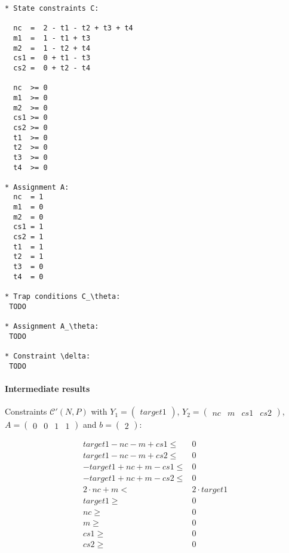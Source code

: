 \documentclass{article}
\begin{document}
\begin{verbatim}
* State constraints C:

  nc  =  2 - t1 - t2 + t3 + t4
  m1  =  1 - t1 + t3
  m2  =  1 - t2 + t4
  cs1 =  0 + t1 - t3
  cs2 =  0 + t2 - t4

  nc  >= 0
  m1  >= 0
  m2  >= 0
  cs1 >= 0
  cs2 >= 0
  t1  >= 0
  t2  >= 0
  t3  >= 0
  t4  >= 0

* Assignment A:
  nc  = 1
  m1  = 0
  m2  = 0
  cs1 = 1
  cs2 = 1
  t1  = 1
  t2  = 1
  t3  = 0
  t4  = 0

* Trap conditions C_\theta:
 TODO

* Assignment A_\theta:
 TODO

* Constraint \delta:
 TODO
\end{verbatim}








































\iffalse

\paragraph{Intermediate results}
Constraints $\mathcal C'(N, P)$ with
$Y_1 = \begin{pmatrix}target1 \end{pmatrix}$,
$Y_2 =\begin{pmatrix}nc & m & cs1 & cs2\end{pmatrix}$,
$A =\begin{pmatrix}0 & 0 & 1 & 1 \end{pmatrix}$ and
$b =\begin{pmatrix}2 \end{pmatrix}$:

\begin{align*}
  target1 - nc - m + cs1 \le& 0 \\ 
  target1 - nc - m + cs2 \le& 0 \\ 
  - target1 + nc + m - cs1 \le& 0 \\ 
  - target1 + nc + m - cs2 \le& 0 \\ 
2 \cdot nc + m <& 2 \cdot target1 \\
  target1 \ge& 0 \\
  nc \ge& 0 \\
  m \ge& 0 \\
  cs1 \ge& 0 \\
  cs2 \ge& 0
\end{align*}
\end{document}
